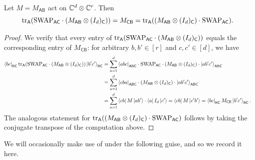 \documentclass{article}
\newcommand{\swap}{\mathrm{SWAP}}
\newcommand{\reg}[1]{\mathsf{#1}}
\begin{document}
\begin{proposition}\label{prop:no-tensor-network-diagrams}
    Let $M = M_{\reg{A}\reg{B}}$ act on $\mathbb C^d \otimes \mathbb C^r$. Then
    \begin{equation*}
        \tr_{\reg{A}}(\swap_{\reg{A}\reg{C}} \cdot (M_{\reg{A}\reg{B}} \otimes (I_d)_\reg{C}))
        = M_{\reg{C}\reg{B}}
        = \tr_{\reg{A}}((M_{\reg{A}\reg{B}} \otimes (I_d)_\reg{C}) \cdot \swap_{\reg{A}\reg{C}}).
    \end{equation*}
\end{proposition}
\begin{proof}
    We verify that every entry of $\tr_{\reg{A}}(\swap_{\reg{A}\reg{C}} \cdot (M_{\reg{A}\reg{B}} \otimes (I_d)_\reg{C}))$ equals the corresponding entry of $M_{\reg{C}\reg{B}}$: for arbitrary $b,b' \in [r]$ and $c,c' \in [d]$, we have
    \begin{align*}
        \bra{bc}_{\reg{BC}} \tr_{\reg{A}}(\swap_{\reg{A}\reg{C}} \cdot (M_{\reg{A}\reg{B}} \otimes (I_d)_\reg{C})) \ket{b'c'}_{\reg{BC}}
        &= \sum_{a=1}^d \bra{abc}_{\reg{ABC}} \cdot \swap_{\reg{AC}} \cdot (M_{\reg{AB}} \otimes (I_d)_{\reg{C}}) \cdot \ket{ab'c'}_{\reg{ABC}}\\
        &= \sum_{a=1}^d \bra{cba}_{\reg{ABC}} \cdot (M_{\reg{AB}} \otimes (I_d)_{\reg{C}}) \cdot \ket{ab'c'}_{\reg{ABC}} \\
        &= \sum_{a=1}^d \bra{cb}M\ket{ab'} \cdot \bra{a}I_d\ket{c'}
        = \bra{cb}M\ket{c'b'}
        = \bra{bc}_{\reg{BC}} M_{\reg{CB}} \ket{b'c'}_{\reg{BC}}.
    \end{align*}
    The analogous statement for $\tr_{\reg{A}}((M_{\reg{A}\reg{B}} \otimes (I_d)_\reg{C}) \cdot \swap_{\reg{A}\reg{C}})$ follows by taking the conjugate transpose of the computation above.
\end{proof}

We will occasionally make use of  under the following guise, and so we record it here.
\end{document}

